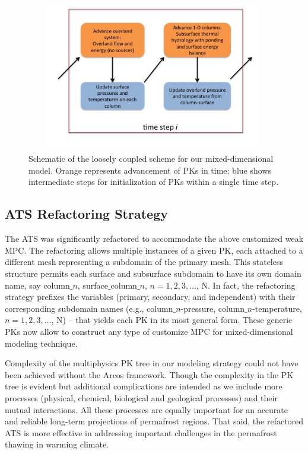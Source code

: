 \documentclass[review]{elsarticle}
\begin{document}

\begin{figure}[h]
\centering
\includegraphics[height = 6.5cm, width=11cm]{figures/Figure5-new.jpg}
\caption{Schematic of the loosely coupled scheme for our mixed-dimensional model. Orange represents advancement of PKs in time; blue shows intermediate steps for initialization of PKs within a single time step.}
\label{coupling-schematic}
\end{figure}


\subsection{ATS Refactoring Strategy}
The ATS was significantly refactored to accommodate the above customized weak MPC. The refactoring allows multiple instances of a given PK, each attached to a different mesh representing a subdomain of the primary mesh. This stateless structure permits each surface and subsurface subdomain to have its own domain name, say 
column$\_n$, surface$\_$column$\_n$, $n=1,2,3, \dots$, N. In fact, the refactoring strategy prefixes the variables (primary, secondary, and independent) with their corresponding subdomain names (e.g., column$\_n$-pressure, column$\_n$-temperature, $n=1,2,3, \dots$, N) -- that yields each PK in its most general form. These generic PKs now allow to construct any type of customize MPC for mixed-dimensional modeling technique.

Complexity of the multiphysics PK tree in our modeling strategy could not have been achieved without the Arcos framework. Though the complexity in the PK tree is evident but additional complications are intended as we include more processes (physical, chemical, biological and geological processes) and their mutual interactions. All these processes are equally important for an accurate and reliable long-term projections of permafrost regions. That said, the refactored ATS is more effective in addressing important challenges in the permafrost thawing in warming climate.
\end{document}
